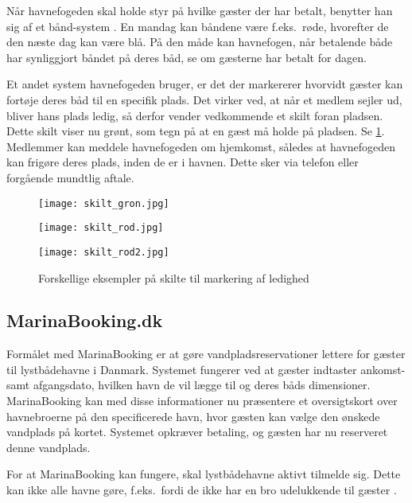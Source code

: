 Når havnefogeden skal holde styr på hvilke gæster der har betalt, benytter han sig af et bånd-system \cite{int_hf}. En mandag kan båndene være f.eks.\ røde, hvorefter de den næste dag kan være blå. På den måde kan havnefogen, når betalende både har synliggjort båndet på deres båd, se om gæsterne har betalt for dagen.

Et andet system havnefogeden bruger, er det der markererer hvorvidt gæster kan fortøje deres båd til en specifik plads. Det virker ved, at når et medlem sejler ud, bliver hans plads ledig, så derfor vender vedkommende et skilt foran pladsen. Dette skilt viser nu grønt, som tegn på at en gæst må holde på pladsen. Se \cref{fig:skilte}. Medlemmer kan meddele havnefogeden om hjemkomst, således at havnefogeden kan frigøre deres plads, inden de er i havnen. Dette sker via telefon eller forgående mundtlig aftale.

\begin{figure}[h]
  \centering
  \begin{minipage}{0.30\textwidth}
    \texttt{[image: skilt\_gron.jpg]}
  \end{minipage}
  \begin{minipage}{0.30\textwidth}
    \texttt{[image: skilt\_rod.jpg]}
  \end{minipage}
  \begin{minipage}{0.30\textwidth}
    \texttt{[image: skilt\_rod2.jpg]}
  \end{minipage}
  \caption{Forskellige eksempler på skilte til markering af ledighed}
  \label{fig:skilte}
\end{figure}

\subsection{MarinaBooking.dk} %
\label{sub:MarinaBooking.dk}

Formålet med MarinaBooking \cite{marinabooking} er at gøre vandpladsreservationer lettere for gæster til lystbådehavne i Danmark. Systemet fungerer ved at gæster indtaster ankomst- samt afgangsdato, hvilken havn de vil lægge til og deres båds dimensioner. MarinaBooking kan med disse informationer nu præsentere et oversigtskort over havnebroerne på den specificerede havn, hvor gæsten kan vælge den ønskede vandplads på kortet. Systemet opkræver betaling, og gæsten har nu reserveret denne vandplads.

For at MarinaBooking kan fungere, skal lystbådehavne aktivt tilmelde sig. Dette kan ikke alle havne gøre, f.eks.\ fordi de ikke har en bro udelukkende til gæster \cite{int_vb_sl} . 

